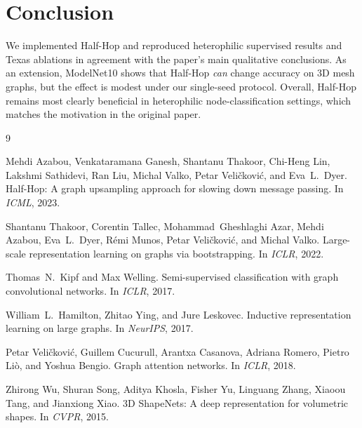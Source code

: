 \documentclass[11pt,a4paper]{article}
\begin{document}
\section{Conclusion}
We implemented Half-Hop and reproduced heterophilic supervised results and
Texas ablations in agreement with the paper's main qualitative conclusions.
As an extension, ModelNet10 shows that Half-Hop \emph{can} change accuracy on
3D mesh graphs, but the effect is modest under our single-seed protocol.
Overall, Half-Hop remains most clearly beneficial in heterophilic
node-classification settings, which matches the motivation in the original
paper.

\begin{thebibliography}{9}

Mehdi Azabou, Venkataramana Ganesh, Shantanu Thakoor, Chi-Heng Lin,
Lakshmi Sathidevi, Ran Liu, Michal Valko, Petar Veli{\v{c}}kovi{\'c},
and Eva~L.\ Dyer.
\newblock Half-Hop: A graph upsampling approach for slowing down message
passing.
\newblock In \emph{ICML}, 2023.

Shantanu Thakoor, Corentin Tallec, Mohammad~Gheshlaghi Azar, Mehdi Azabou,
Eva~L.\ Dyer, R{\'e}mi Munos, Petar Veli{\v{c}}kovi{\'c}, and Michal Valko.
\newblock Large-scale representation learning on graphs via bootstrapping.
\newblock In \emph{ICLR}, 2022.

Thomas~N.\ Kipf and Max Welling.
\newblock Semi-supervised classification with graph convolutional networks.
\newblock In \emph{ICLR}, 2017.

William~L.\ Hamilton, Zhitao Ying, and Jure Leskovec.
\newblock Inductive representation learning on large graphs.
\newblock In \emph{NeurIPS}, 2017.

Petar Veli{\v{c}}kovi{\'c}, Guillem Cucurull, Arantxa Casanova, Adriana Romero,
Pietro Li{\`o}, and Yoshua Bengio.
\newblock Graph attention networks.
\newblock In \emph{ICLR}, 2018.

Zhirong Wu, Shuran Song, Aditya Khosla, Fisher Yu, Linguang Zhang,
Xiaoou Tang, and Jianxiong Xiao.
\newblock 3D ShapeNets: A deep representation for volumetric shapes.
\newblock In \emph{CVPR}, 2015.

\end{thebibliography}
\end{document}
